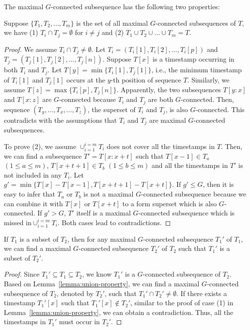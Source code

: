 The maximal $G$-connected subsequence has the following two properties:
\begin{lemma}\label{lemma:union-property}
Suppose $\{T_1,T_2,\ldots,T_m\}$ is the set of all maximal $G$-connected subsequences of $T$, we have (1) $T_i\cap T_j=\emptyset$ for $i\neq j$ and (2) $T_1\cup T_2\cup\ldots\cup T_m=T$.
\end{lemma}
\begin{proof}
We assume $T_i\cap T_j\neq \emptyset$. Let $T_i=(T_i[1], T_i[2],\ldots,T_i[p])$ and $T_j= (T_j[1], T_j[2],\ldots,T_j[n])$. Suppose $T[x]$ is a timestamp occurring in both $T_i$ and $T_j$. Let $T[y]=\min\{T_i[1],T_j[1]\}$, i.e., the minimum timestamp of $T_i[1]$ and $T_j[1]$ occurs at the $y$-th position of sequence $T$. Similarly, we assume $T[z]=\max\{T_i[p], T_j[n]\}$. Apparently, the two subsequences $T[y:x]$ and $T[x:z]$ are $G$-connected because $T_i$ and $T_j$ are both $G$-connected. Then, sequence $(T_y,\ldots,T_x,\ldots,T_z)$, the superset of $T_i$ and $T_j$, is also $G$-connected. This contradicts with the assumptions that $T_i$ and $T_j$ are maximal $G$-connected subsequences. 




To prove (2), we assume $\cup_{i=1}^{i=m} T_i$ does not cover all the timestamps in $T$. Then, we can find a subsequence $T'=T[x:x+t]$ such that $T[x-1]\in T_a$ $(1\leq a\leq m)$, $T[x+t+1]\in T_b$ $(1\leq b\leq m)$ and all the timestamps in $T'$ is not included in any $T_i$. Let $g'=\min\{T[x]-T[x-1], T[x+t+1]-T[x+t]\}$. If $g'\leq G$, then it is easy to infer that $T_a$ or $T_b$ is not a maximal $G$-connected subsequence because we can combine it with $T[x]$ or $T[x+t]$  to a form superset which is also $G$-connected. If $g'>G$, $T'$ itself is a maximal $G$-connected subsequence which is missed in$\cup_{i=1}^{i=m} T_i$. Both cases lead to contradictions.
\end{proof}




\begin{lemma}\label{lemma:subset-property}
If $T_1$ is a subset of $T_2$, then for any maximal $G$-connected subsequence $T_1'$ of $T_1$, we can find a maximal $G$-connected subsequence $T_2'$ of $T_2$ such that $T_1'$ is a subset of $T_2'$.
\end{lemma}
\begin{proof}
Since $T_1' \subseteq T_1 \subseteq T_2 $, we know $T_1'$ is a $G$-connected subsequence of $T_2$. Based on Lemma~\ref{lemma:union-property}, we can find a maximal $G$-connected subsequence of $T_2$, denoted by $T_2'$, such that $T_1'\cap T_2'\neq \emptyset$. If there exists a timestamp $T_1'[x]$ such that $T_1'[x]\notin T_2'$, similar to the proof of case (1) in Lemma~\ref{lemma:union-property}, we can obtain a contradiction. Thus, all the timestamps in $T_1'$ must occur in $T_2'$.
\end{proof}

